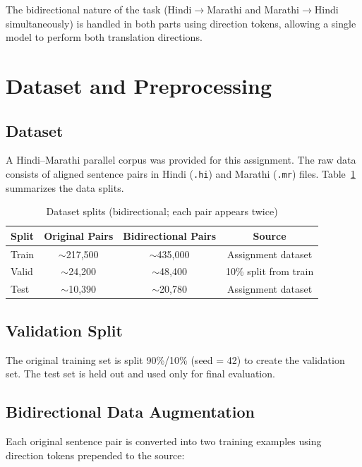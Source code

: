 \documentclass[12pt,a4paper]{article}
\begin{document}
The bidirectional nature of the task (Hindi$\to$Marathi and Marathi$\to$Hindi simultaneously) is handled in both parts using direction tokens, allowing a single model to perform both translation directions.

\section{Dataset and Preprocessing}

\subsection{Dataset}

A Hindi–Marathi parallel corpus was provided for this assignment. The raw data consists of aligned sentence pairs in Hindi (\texttt{.hi}) and Marathi (\texttt{.mr}) files. Table~\ref{tab:dataset} summarizes the data splits.

\begin{table}[H]
\centering
\caption{Dataset splits (bidirectional; each pair appears twice)}
\label{tab:dataset}
\begin{tabular}{lccc}
\toprule
\textbf{Split} & \textbf{Original Pairs} & \textbf{Bidirectional Pairs} & \textbf{Source} \\
\midrule
Train  & $\sim$217,500 & $\sim$435,000 & Assignment dataset \\
Valid  & $\sim$24,200  & $\sim$48,400  & 10\% split from train \\
Test   & $\sim$10,390  & $\sim$20,780  & Assignment dataset \\
\bottomrule
\end{tabular}
\end{table}

\subsection{Validation Split}

The original training set is split 90\%/10\% (seed = 42) to create the validation set. The test set is held out and used only for final evaluation.

\subsection{Bidirectional Data Augmentation}

Each original sentence pair is converted into two training examples using direction tokens prepended to the source:
\end{document}
